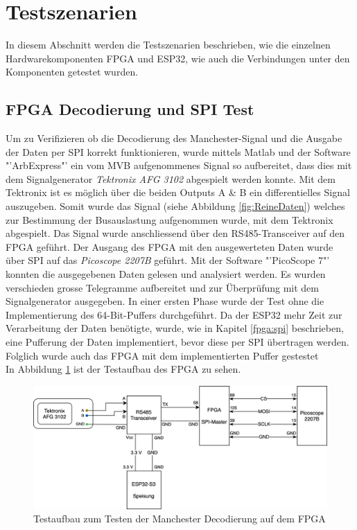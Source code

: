 \section{Testszenarien} %
\label{sec:Testszenarien}
In diesem Abschnitt werden die Testszenarien beschrieben, wie die einzelnen Hardwarekomponenten FPGA und ESP32, wie auch die Verbindungen unter den Komponenten getestet wurden.

\subsection{FPGA Decodierung und SPI Test}
\label{sub:FPGADecSPITest}
Um zu Verifizieren ob die Decodierung des Manchester-Signal und die Ausgabe der Daten per SPI korrekt funktionieren, wurde mittels Matlab und der Software "'ArbExpress"' ein vom MVB aufgenommenes Signal so aufbereitet, dass dies mit dem Signalgenerator \textit{Tektronix AFG 3102} abgespielt werden konnte. Mit dem Tektronix ist es möglich über die beiden Outputs A \& B ein differentielles Signal auszugeben. Somit wurde das Signal (siehe Abbildung \ref{fig:ReineDaten}) welches zur Bestimmung der Busauslastung aufgenommen wurde, mit dem Tektronix abgespielt. Das Signal wurde anschliessend über den RS485-Transceiver auf den FPGA geführt. Der Ausgang des FPGA mit den ausgewerteten Daten wurde über SPI auf das \textit{Picoscope 2207B} geführt. Mit der Software "'PicoScope 7"' konnten die ausgegebenen Daten gelesen und analysiert werden. Es wurden verschieden grosse Telegramme aufbereitet und zur Überprüfung mit dem Signalgenerator ausgegeben. In einer ersten Phase wurde der Test ohne die Implementierung des 64-Bit-Puffers durchgeführt. Da der ESP32 mehr Zeit zur Verarbeitung der Daten benötigte, wurde, wie in Kapitel \ref{fpga:spi} beschrieben, eine Pufferung der Daten implementiert, bevor diese per SPI übertragen werden. Folglich wurde auch das FPGA mit dem implementierten Puffer gestestet\\
In Abbildung \ref{fig:TestszenarioFPGA} ist der Testaufbau des FPGA zu sehen.

\begin{figure}[H]
    \centering
    \includegraphics[width=0.9\linewidth]{Figures/Chap3/Testszenarien/Testszenario_FPGA.png}
    \caption{Testaufbau zum Testen der Manchester Decodierung auf dem FPGA}
    \label{fig:TestszenarioFPGA}
\end{figure}


